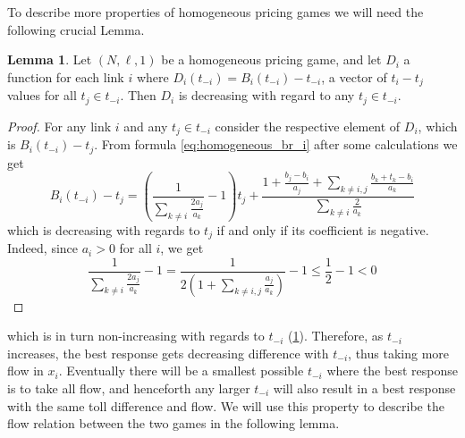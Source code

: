 \documentclass[10pt,a4paper]{book}
\theoremstyle{definition}
\newtheorem{lemma}[definition]{Lemma}
\theoremstyle{comment}
\begin{document}

To describe more properties of homogeneous pricing games we will need the following crucial Lemma.
\begin{lemma}
	\label{lemma:tolls_diff}
	Let $(N, \ell, 1)$ be a homogeneous pricing game, and let $D_i$ a function for each link $i$ where $D_i(t_{-i}) = B_i(t_{-i}) - t_{-i}$, a vector of $t_i - t_j$ values for all $t_j \in t_{-i}$.
	Then $D_i$ is decreasing with regard to any $t_j \in t_{-i}$.
\end{lemma}

\begin{proof}
	For any link $i$ and any $t_j \in t_{-i}$ consider the respective element of $D_i$, which is $B_i(t_{-i}) - t_j$.
	From formula \ref{eq:homogeneous_br_i} after some calculations we get
	\[
	B_i(t_{-i}) - t_j = \left(\frac{1}{\sum_{k \ne i} \frac{2a_j}{a_k}} - 1\right)t_j + \frac{1 + \frac{b_j - b_i}{a_j} + \sum_{k \ne i, j}\frac{b_k + t_k - b_i}{a_k}}{\sum_{k \ne i} \frac{2}{a_k}}
	\]
	which is decreasing with regards to $t_j$ if and only if its coefficient is negative.
	Indeed, since $a_i > 0$ for all $i$, we get
	\[
	\frac{1}{\sum_{k \ne i} \frac{2a_j}{a_k}} - 1 = \frac{1}{2 \left(1 + \sum_{k \ne i, j} \frac{a_j}{a_k}\right)} - 1 \leq \frac{1}{2} - 1 < 0
	\]
\end{proof}

 which is in turn non-increasing with regards to $t_{-i}$ (\ref{lemma:tolls_diff}).
Therefore, as $t_{-i}$ increases, the best response gets decreasing difference with $t_{-i}$, thus taking more flow in $x_i$.
Eventually there will be a smallest possible $t_{-i}$ where the best response is to take all flow, and henceforth any larger $t_{-i}$ will also result in a best response with the same toll difference and flow.
We will use this property to describe the flow relation between the two games in the following lemma.
\end{document}

